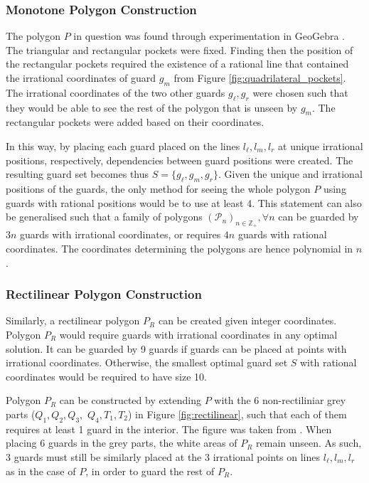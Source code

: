 \subsubsection{Monotone Polygon Construction}
The polygon $P$ in question  was found through experimentation in GeoGebra \cite{geogebra}. The triangular and rectangular pockets were fixed. Finding then the position of the rectangular pockets required the existence of a rational line that contained the irrational coordinates of guard $g_m$ from Figure \ref{fig:quadrilateral_pockets}. The irrational coordinates of the two other guards $g_\ell, g_r$ were chosen such that they would be able to see the rest of the polygon that is unseen by $g_m$. The rectangular pockets were added based on their coordinates.

In this way, by placing each guard placed on the lines $l_\ell, l_m, l_r$ at unique irrational positions, respectively, dependencies between guard positions were created. The resulting guard set becomes thus $S = \{g_\ell, g_m, g_r\}$.  Given the unique and irrational positions of the guards, the only method for seeing the whole polygon $P$ using guards with rational positions would be to use at least 4. This statement can also be generalised such that a family of polygons $(\mathcal{P}_n)_{n \in \mathbb{Z}_+}, \forall n$ can be guarded by $3n$ guards with irrational coordinates, or requires $4n$ guards with rational coordinates. The coordinates determining the polygons are hence polynomial in $n$.

\subsubsection{Rectilinear Polygon Construction}
Similarly, a rectilinear polygon $P_R$ can be created given integer coordinates. Polygon $P_R$ would require guards with irrational coordinates in any optimal solution. It can be guarded by 9 guards if guards can be placed at points with irrational coordinates. Otherwise, the smallest optimal guard set $S$ with rational coordinates would be required to have size 10.

Polygon $P_R$ can be constructed by extending $P$ with the 6 non-rectiliniar grey parts ($Q_1, Q_2, Q_3,$ $Q_4, T_1, T_2$) in Figure \ref{fig:rectilinear}, such that each of them requires at least 1 guard in the interior. The figure was taken from \cite{1057165}. When placing 6 guards in the grey parts, the white areas of $P_R$ remain unseen. As such, 3 guards must still be similarly placed at the 3 irrational points on lines $l_\ell, l_m, l_r$ as in the case of $P$, in order to guard the rest of $P_R$.

